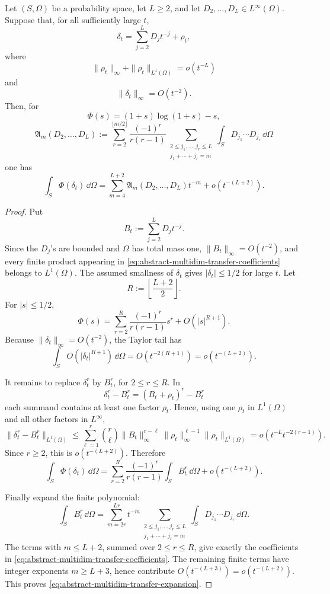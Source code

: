 \begin{lemma}%
\label{lem:multidim-density-to-entropy-transfer}
Let \((S,\Omega)\) be a probability space, let \(L\ge2\), and let
\(D_2,\ldots,D_L\in L^\infty(\Omega)\).  Suppose that, for all sufficiently
large \(t\),
\[
\delta_t=\sum_{j=2}^{L}D_jt^{-j}+\rho_t,
\]
where
\[
\|\rho_t\|_\infty+\|\rho_t\|_{L^1(\Omega)}=o(t^{-L})
\]
and
\[
\|\delta_t\|_\infty=O(t^{-2}).
\]
Then, for
\[
\Phi(s)=(1+s)\log(1+s)-s,
\]
\begin{equation}\label{eq:abstract-multidim-transfer-coefficients}
\mathfrak A_m(D_2,\ldots,D_L)
:=
\sum_{r=2}^{\lfloor m/2\rfloor}
\frac{(-1)^r}{r(r-1)}
\sum_{\substack{2\le j_1,\ldots,j_r\le L\\
j_1+\cdots+j_r=m}}
\int_S D_{j_1}\cdots D_{j_r}\,\dd\Omega
\end{equation}
one has
\begin{equation}\label{eq:abstract-multidim-transfer-expansion}
\int_S\Phi(\delta_t)\,\dd\Omega
=
\sum_{m=4}^{L+2}\mathfrak A_m(D_2,\ldots,D_L)t^{-m}
+o(t^{-(L+2)}).
\end{equation}
\end{lemma}

\begin{proof}
Put
\[
B_t:=\sum_{j=2}^{L}D_jt^{-j}.
\]
Since the \(D_j\)'s are bounded and \(\Omega\) has total mass one,
\(\|B_t\|_\infty=O(t^{-2})\), and every finite product appearing in
\eqref{eq:abstract-multidim-transfer-coefficients} belongs to
\(L^1(\Omega)\).  The assumed smallness of \(\delta_t\) gives
\(|\delta_t|\le1/2\) for large \(t\).  Let
\[
R:=\left\lfloor\frac{L+2}{2}\right\rfloor .
\]
For \(|s|\le1/2\),
\[
\Phi(s)=\sum_{r=2}^{R}\frac{(-1)^r}{r(r-1)}s^r+O(|s|^{R+1}).
\]
Because \(\|\delta_t\|_\infty=O(t^{-2})\), the Taylor tail has
\[
\int_SO(|\delta_t|^{R+1})\,\dd\Omega
=O(t^{-2(R+1)})=o(t^{-(L+2)}).
\]

It remains to replace \(\delta_t^r\) by \(B_t^r\), for \(2\le r\le R\).  In
\[
\delta_t^r-B_t^r=(B_t+\rho_t)^r-B_t^r
\]
each summand contains at least one factor \(\rho_t\).  Hence, using one
\(\rho_t\) in \(L^1(\Omega)\) and all other factors in \(L^\infty\),
\[
\|\delta_t^r-B_t^r\|_{L^1(\Omega)}
\le
\sum_{\ell=1}^{r}\binom r\ell
\|B_t\|_\infty^{r-\ell}
\|\rho_t\|_\infty^{\ell-1}
\|\rho_t\|_{L^1(\Omega)}
=o(t^{-L}t^{-2(r-1)}).
\]
Since \(r\ge2\), this is \(o(t^{-(L+2)})\).  Therefore
\[
\int_S\Phi(\delta_t)\,\dd\Omega
=
\sum_{r=2}^{R}\frac{(-1)^r}{r(r-1)}
\int_SB_t^r\,\dd\Omega
+o(t^{-(L+2)}).
\]

Finally expand the finite polynomial:
\[
\int_SB_t^r\,\dd\Omega
=
\sum_{m=2r}^{Lr}t^{-m}
\sum_{\substack{2\le j_1,\ldots,j_r\le L\\
j_1+\cdots+j_r=m}}
\int_SD_{j_1}\cdots D_{j_r}\,\dd\Omega .
\]
The terms with \(m\le L+2\), summed over \(2\le r\le R\), give exactly the
coefficients in \eqref{eq:abstract-multidim-transfer-coefficients}.  The
remaining finite terms have integer exponents \(m\ge L+3\), hence contribute
\(O(t^{-(L+3)})=o(t^{-(L+2)})\).  This proves
\eqref{eq:abstract-multidim-transfer-expansion}.
\end{proof}


